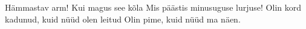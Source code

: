 Hämmastav arm!
Kui magus see kõla
Mis päästis minusuguse lurjuse!
Olin kord kadunud, kuid nüüd olen leitud
Olin pime, kuid nüüd ma näen. 
